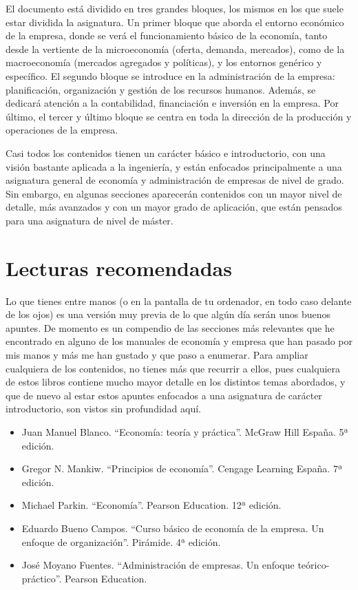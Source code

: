 \documentclass[
]{krantz}
\providecommand{\tightlist}{%
  \setlength{\itemsep}{0pt}\setlength{\parskip}{0pt}}
\begin{document}
El documento está dividido en tres grandes bloques, los mismos en los que suele estar dividida la asignatura. Un primer bloque que aborda el entorno económico de la empresa, donde se verá el funcionamiento básico de la economía, tanto desde la vertiente de la microeconomía (oferta, demanda, mercados), como de la macroeconomía (mercados agregados y políticas), y los entornos genérico y específico. El segundo bloque se introduce en la administración de la empresa: planificación, organización y gestión de los recursos humanos. Además, se dedicará atención a la contabilidad, financiación e inversión en la empresa. Por último, el tercer y último bloque se centra en toda la dirección de la producción y operaciones de la empresa.

Casi todos los contenidos tienen un carácter básico e introductorio, con una visión bastante aplicada a la ingeniería, y están enfocados principalmente a una asignatura general de economía y administración de empresas de nivel de grado. Sin embargo, en algunas secciones aparecerán contenidos con un mayor nivel de detalle, más avanzados y con un mayor grado de aplicación, que están pensados para una asignatura de nivel de máster.

\hypertarget{lecturas-recomendadas}{%
\section*{Lecturas recomendadas}\label{lecturas-recomendadas}}


Lo que tienes entre manos (o en la pantalla de tu ordenador, en todo caso delante de los ojos) es una versión muy previa de lo que algún día serán unos buenos apuntes. De momento es un compendio de las secciones más relevantes que he encontrado en alguno de los manuales de economía y empresa que han pasado por mis manos y más me han gustado y que paso a enumerar. Para ampliar cualquiera de los contenidos, no tienes más que recurrir a ellos, pues cualquiera de estos libros contiene mucho mayor detalle en los distintos temas abordados, y que de nuevo al estar estos apuntes enfocados a una asignatura de carácter introductorio, son vistos sin profundidad aquí.

\begin{itemize}
\tightlist
\item
  Juan Manuel Blanco. ``Economía: teoría y práctica''. McGraw Hill España. 5ª edición.
\item
  Gregor N. Mankiw. ``Principios de economía''. Cengage Learning España. 7ª edición.
\item
  Michael Parkin. ``Economía''. Pearson Education. 12ª edición.
\item
  Eduardo Bueno Campos. ``Curso básico de economía de la empresa. Un enfoque de organización''. Pirámide. 4ª edición.
\item
  José Moyano Fuentes. ``Administración de empresas. Un enfoque teórico-práctico''. Pearson Education.
\end{itemize}
\end{document}
